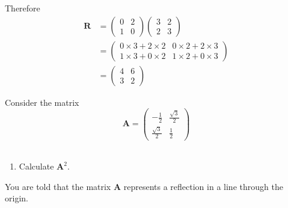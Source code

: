 \documentclass[leqno]{article}
\begin{document}
\begin{enumerate}[
  label=\textbf{\arabic*.},
  leftmargin=*,
  topsep=0pt,
  partopsep=0pt,
  parsep=0pt
]
\begin{djsSolution}
\begin{enumerate}[label=\textbf{(\alph*)}]
Therefore
\begin{align*}
\mathbf R
&=
\begin{pmatrix}0&2\\1&0\end{pmatrix}
\begin{pmatrix}3&2\\2&3\end{pmatrix}\\
&=
\begin{pmatrix}
0\times 3+2\times 2 & 0\times 2+2\times 3\\
1\times 3+0\times 2 & 1\times 2+0\times 3
\end{pmatrix}\\
&=
\begin{pmatrix}4&6\\3&2\end{pmatrix}
\end{align*}
\end{enumerate}
\end{djsSolution}


\newpage

\questionitem

Consider the matrix
\[
\mathbf{A}=\begin{pmatrix}
-\frac{1}{2} & \frac{\sqrt{3}}{2}\\[6pt]
\frac{\sqrt{3}}{2} & \frac{1}{2}
\end{pmatrix}
\] \\

\begin{enumerate}[label=\textbf{(\roman*)}]
  \item Calculate $\mathbf{A}^2$.  \\
\end{enumerate}

You are told that the matrix $\mathbf{A}$ represents a reflection in a line through the origin. \\


\end{enumerate}
\end{document}
